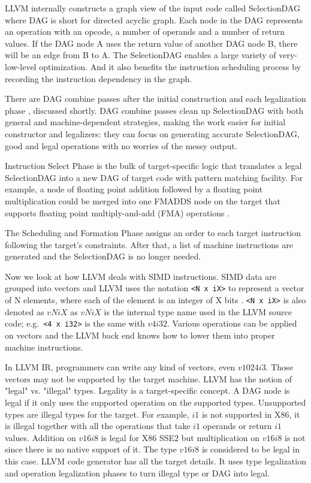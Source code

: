LLVM internally constructs a graph view of the input code called SelectionDAG where DAG is short for directed acyclic graph. Each node in the DAG represents an operation with an opcode, a number of operands and a number of return values. If the DAG node A uses the return value of another DAG node B, there will be an edge from B to A. The SelectionDAG enables a large variety of very-low-level optimization. And it also benefits the instruction scheduling process by recording the instruction dependency in the graph.

There are DAG combine passes after the initial construction and each legalization phase \cite{llvm_code_gen}, discussed shortly. DAG combine passes clean up SelectionDAG with both general and machine-dependent strategies, making the work easier for initial constructor and legalizers: they can focus on generating accurate SelectionDAG, good and legal operations with no worries of the messy output.

Instruction Select Phase is the bulk of target-specific logic that translates a legal SelectionDAG into a new DAG of target code with pattern matching facility. For example, a node of floating point addition followed by a floating point multiplication could be merged into one FMADDS node on the target that supports floating point multiply-and-add (FMA) operations \cite{llvm_code_gen}.

The Scheduling and Formation Phase assigns an order to each target instruction following the target's constraints. After that, a list of machine instructions are generated and the SelectionDAG is no longer needed.

Now we look at how LLVM deals with SIMD instructions. SIMD data are grouped into vectors and LLVM uses the notation \verb|<N x iX>| to represent a vector of N elements, where each of the element is an integer of X bits \cite{llvm_lang_ref, hybrid_simd_type_legalize}. \verb|<N x iX>| is also denoted as $vNiX$ as $vNiX$ is the internal type name used in the LLVM source code; e.g.\ \verb|<4 x i32>| is the same with $v4i32$. Various operations can be applied on vectors and the LLVM back end knows how to lower them into proper machine instructions.

In LLVM IR, programmers can write any kind of vectors, even $v1024i3$. Those vectors may not be supported by the target machine. LLVM has the notion of "legal" vs. "illegal" types. Legality is a target-specific concept. A DAG node is legal if it only uses the supported operation on the supported types. Unsupported types are illegal types for the target. For example, $i1$ is not supported in X86, it is illegal together with all the operations that take $i1$ operands or return $i1$ values. Addition on $v16i8$ is legal for X86 SSE2 but multiplication on $v16i8$ is not since there is no native support of it. The type $v16i8$ is considered to be legal in this case. LLVM code generator has all the target details. It uses type legalization and operation legalization phases to turn illegal type or DAG into legal\cite{llvm_code_gen}.

